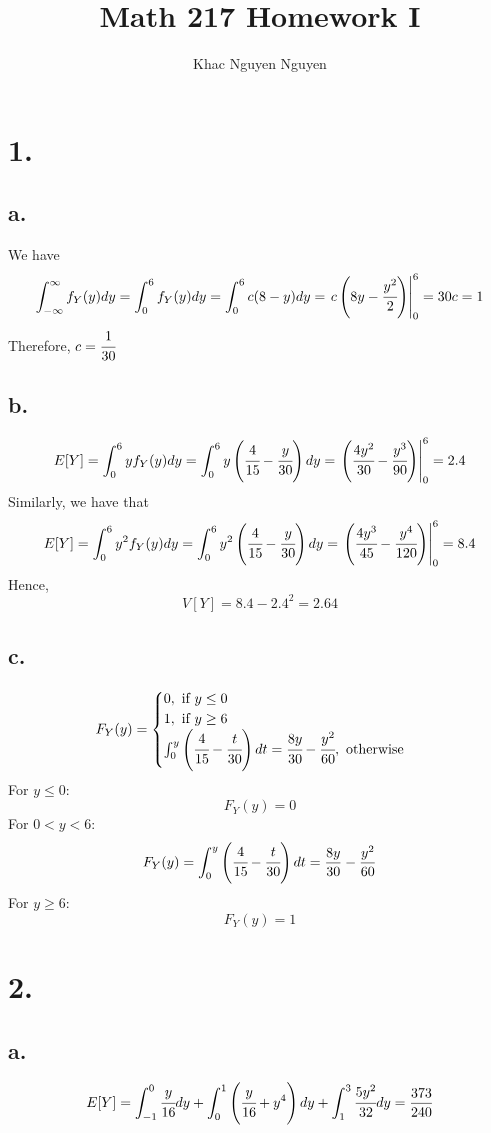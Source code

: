 \documentclass[11pt]{article}
\title{\textbf{Math 217 Homework I}}
\author{Khac Nguyen Nguyen}
\date{}
\begin{document}
\section*{1.}
\subsection*{a.}
We have
\[
\int_{-\infty}^\infty f_Y(y)dy = \int_0^6 f_Y(y) dy = \int_0^6 c(8-y) dy = \left.c\left(8y-\cfrac{y^2}{2}\right) \right|_0^6 =30c=1
\]
Therefore, $c = \cfrac{1}{30}$\\
\subsection*{b.}
\[
    E[Y] = \int_0^6 y f_Y(y) dy = \int_0^6 y\left(\cfrac{4}{15} - \cfrac{y}{30}\right)dy = \left.\left(\cfrac{4y^2}{30}-\cfrac{y^3}{90}\right) \right|_0^6 = 2.4
\]
Similarly, we have that 
\[
    E[Y] = \int_0^6 y^2 f_Y(y) dy = \int_0^6 y^2\left(\cfrac{4}{15} - \cfrac{y}{30}\right)dy = \left.\left(\cfrac{4y^3}{45}-\cfrac{y^4}{120}\right) \right|_0^6 = 8.4
\]
Hence, 
\[
    V[Y] = 8.4 - 2.4^2 = 2.64\]
\subsection*{c.}
\begin{equation*}
    F_Y(y) =
    \begin{cases}
        0, \text{ if } y \le 0 \\
        1, \text{ if } y \ge 6 \\
        \int_0^y \left(\cfrac{4}{15} - \cfrac{t}{30}\right)dt = \cfrac{8y}{30} - \cfrac{y^2}{60}, \text{ otherwise }
    \end{cases}
\end{equation*}
For $y\le 0$:
\[
F_Y(y) = 0
\]
For $0<y<6$:
\[
F_Y(y) =\int_0^y \left(\cfrac{4}{15} - \cfrac{t}{30}\right)dt = \frac{8y}{30} - \frac{y^2}{60}
\]
For $y\ge 6$:
\[
F_Y(y) = 1
\]
\pagebreak




\section*{2.}
\subsection*{a.}
\[
E[Y] = \int_{-1}^0 \cfrac{y}{16} dy + \int_0^{1} \left( \cfrac{y}{16} + y^4 \right) dy + \int_1^3 \cfrac{5y^2}{32} dy = \frac{373}{240} 
\]
\end{document}
